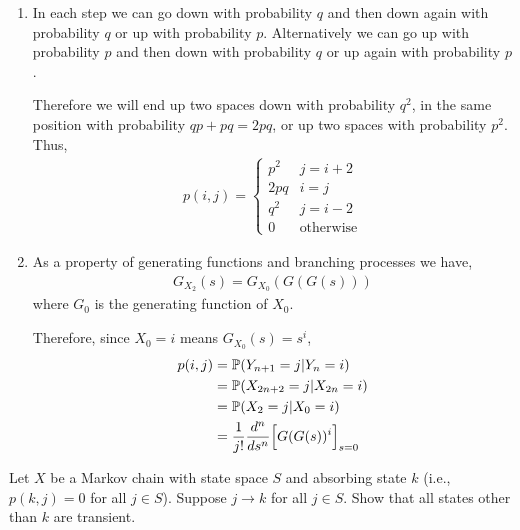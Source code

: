 \documentclass[10pt]{article}
\begin{document}
\begin{solution}[Solution]
\begin{enumerate}[label=(\alph*)]
    \item
        In each step we can go down with probability \( q \) and then down again with probability \( q \) or up with probability \( p \). Alternatively we can go up with probability \( p \) and then down with probability \( q \) or up again with probability \( p \). 

        Therefore we will end up two spaces down with probability \( q^2 \), in the same position with probability \( qp+pq = 2pq \), or up two spaces with probability \( p^2 \). Thus,
        \begin{align*}
            p(i,j) = \begin{cases} p^2 & j=i+2 \\ 2pq & i=j \\ q^2 & j=i-2 \\ 0 & \text{otherwise}\end{cases} 
        \end{align*}
    \item
        As a property of generating functions and branching processes we have,
        \begin{align*}
            G_{X_2}(s) 
            = G_{X_0}(G(G(s)))
        \end{align*}
        where \( G_0 \) is the generating function of \( X_0 \).

        Therefore, since \( X_0 = i \) means \( G_{X_0}(s) = s^i \),
        \begin{align*}
            p(i,j) 
            &= \mathbb{P}(Y_{n+1} = j | Y_n = i)
            \\&= \mathbb{P}(X_{2n+2} = j | X_{2n} =i)
            \\&= \mathbb{P}(X_2 = j | X_0 = i)
            \\&= \dfrac{1}{j!} \dfrac{d^n}{ds^n}\Big[ G(G(s))^i \Big]_{s=0}
        \end{align*}
\end{enumerate}
\end{solution}

\begin{problem}[Exercise 4.3]
Let \( X \) be a Markov chain with state space \( S \) and absorbing state \( k \) (i.e., \( p(k, j) = 0 \) for all \( j \in S \)). Suppose \( j\rightarrow k\) for all \( j\in S \). Show that all states other than \( k \) are transient.
\end{problem}
\end{document}

